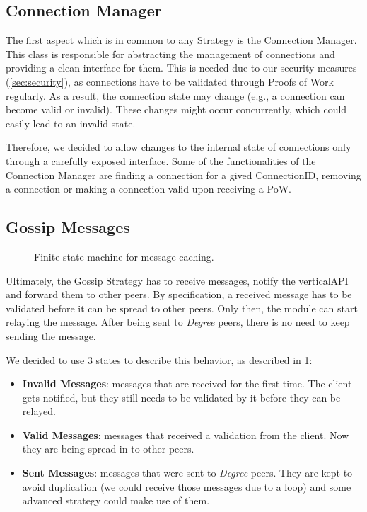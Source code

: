 \documentclass[a4paper,english,10pt,NET]{tumarticle}
\begin{document}
\subsection{Connection Manager}

The first aspect which is in common to any Strategy is the Connection Manager. This class is responsible for abstracting the management of connections and providing a clean interface for them. This is needed due to our security measures (\cref{sec:security}), as connections have to be validated through Proofs of Work regularly. As a result, the connection state may change (e.g., a connection can become valid or invalid). These changes might occur concurrently, which could easily lead to an invalid state.

Therefore, we decided to allow changes to the internal state of connections only through a carefully exposed interface. Some of the functionalities of the Connection Manager are finding a connection for a gived ConnectionID, removing a connection or making a connection valid upon receiving a PoW.

\subsection{Gossip Messages}

\begin{figure}
	\centering
	
	\caption{Finite state machine for message caching.}
	\label{fig:fsm_msgs}
\end{figure}

Ultimately, the Gossip Strategy has to receive messages, notify the verticalAPI and forward them to other peers. By specification, a received message has to be validated before it can be spread to other peers. Only then, the module can start relaying the message. After being sent to \textit{Degree} peers, there is no need to keep sending the message. 

We decided to use 3 states to describe this behavior, as described in \cref{fig:fsm_msgs}: 

\begin{itemize}
	\item \textbf{Invalid Messages}: messages that are received for the first time. The client gets notified, but they still needs to be validated by it before they can be relayed. 
	\item \textbf{Valid Messages}: messages that received a validation from the client. Now they are being spread in to other peers.
	\item \textbf{Sent Messages}: messages that were sent to \textit{Degree} peers. They are kept to avoid duplication (we could receive those messages due to a loop) and some advanced strategy could make use of them.
\end{itemize}
\end{document}
